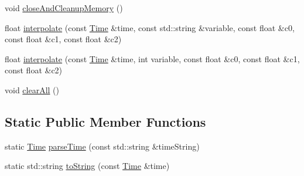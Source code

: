 \begin{DoxyCompactItemize}
\item 
void \hyperlink{classccmc_1_1_time_interpolator_ab1063eb20024f1f3e9923b1cff0a4060}{close\-And\-Cleanup\-Memory} ()
\item 
float \hyperlink{classccmc_1_1_time_interpolator_ab80987872d9d6d58c49d30a86e499e86}{interpolate} (const \hyperlink{classccmc_1_1_time}{Time} \&time, const std\-::string \&variable, const float \&c0, const float \&c1, const float \&c2)
\item 
float \hyperlink{classccmc_1_1_time_interpolator_ac8a3ca21476a05edf2ea427369266505}{interpolate} (const \hyperlink{classccmc_1_1_time}{Time} \&time, int variable, const float \&c0, const float \&c1, const float \&c2)
\item 
void \hyperlink{classccmc_1_1_time_interpolator_a6295ebae47e50a0d80fd646a294d4ccd}{clear\-All} ()
\end{DoxyCompactItemize}
\subsection*{Static Public Member Functions}
\begin{DoxyCompactItemize}
\item 
static \hyperlink{classccmc_1_1_time}{Time} \hyperlink{classccmc_1_1_time_interpolator_a0d265523f630f65ba2f905cda85a66eb}{parse\-Time} (const std\-::string \&time\-String)
\item 
static std\-::string \hyperlink{classccmc_1_1_time_interpolator_ab14064752057b303dce510fd9b44caf2}{to\-String} (const \hyperlink{classccmc_1_1_time}{Time} \&time)
\end{DoxyCompactItemize}


